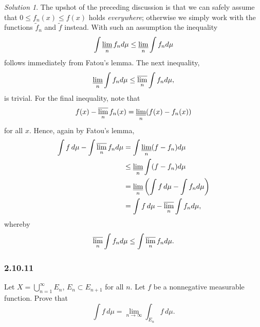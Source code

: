 \documentclass{report}
\theoremstyle{remark}
\newtheorem*{solution}{Solution}
\begin{document}
\begin{solution}
  The upshot of the preceding discussion is that we can safely assume that $0 \le f_n(x) \le f(x)$ holds \emph{everywhere}; otherwise we simply work with the functions $\tilde f_n$ and $\tilde f$ instead. With such an assumption the inequality
  \begin{equation*}
    \int \varliminf_n f_n d\mu \le \varliminf_n \int f_n d\mu
  \end{equation*}
  follows immediately from Fatou's lemma. The next inequality,
  \begin{equation*}
    \varliminf_n \int f_n d\mu \le \varlimsup_n \int f_n d\mu,
  \end{equation*}
  is trivial. For the final inequality, note that
  \begin{equation*}
    f(x) - \varlimsup_n f_n(x) = \varliminf_n (f(x) - f_n(x))
  \end{equation*}
  for all $x$. Hence, again by Fatou's lemma,
  \begin{equation*}
    \begin{split}
      \int f \, d\mu - \int \varlimsup_n f_n d\mu &= \int \varliminf_n (f - f_n) d\mu \\
      &\le \varliminf_n \int (f - f_n) d\mu \\
      &= \varliminf_n \left( \int f \, d\mu - \int f_n d\mu \right) \\
      &= \int f \, d\mu - \varlimsup_n \int f_n d\mu,
    \end{split}
  \end{equation*}
  whereby
  \begin{equation*}
    \varlimsup_n \int f_n d\mu \le \int \varlimsup_n f_n d\mu.
  \end{equation*}
\end{solution}

\subsubsection*{2.10.11}
Let $X = \bigcup_{n=1}^\infty E_n$, $E_n \subset E_{n+1}$ for all $n$. Let $f$ be a nonnegative measurable function. Prove that
\begin{equation*}
  \int f \, d\mu = \lim_{n \to \infty} \int_{E_n} f \, d\mu.
\end{equation*}
\end{document}
